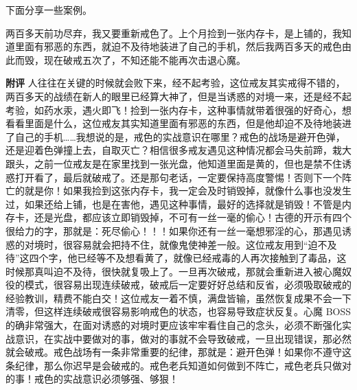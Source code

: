 下面分享一些案例。

\begin{case}
    两百多天前功尽弃，我又要重新戒色了。上个月捡到一张内存卡，是上铺的，我知道里面有邪恶的东西，就迫不及待地装进了自己的手机，然后我两百多天的戒色由此而毁，现在破戒五次了，不知还能不能再次击退心魔。

    \textbf{附评} 人往往在关键的时候就会败下来，经不起考验，这位戒友其实戒得不错的，两百多天的战绩在新人的眼里已经算大神了，但是当诱惑的对境一来，还是经不起考验，如药水汞，遇火即飞！捡到一张内存卡，这种事情就带着很强的好奇心，想看看里面是什么，这位戒友其实知道里面有邪恶的东西，但是他却迫不及待地装进了自己的手机……我想说的是，戒色的实战意识在哪里？戒色的战场是避开色弹，还是迎着色弹撞上去，自取灭亡？相信很多戒友遇见这种情况都会马失前蹄，栽大跟头，之前一位戒友是在家里找到一张光盘，他知道里面是黄的，但也是禁不住诱惑打开看了，最后就破戒了。还是那句老话，一定要保持高度警惕！否则下一个阵亡的就是你！如果我捡到这张内存卡，我一定会及时销毁掉，就像什么事也没发生过，如果还给上铺，也是在害他，遇见这种事情，最好的选择就是销毁！不管是内存卡，还是光盘，都应该立即销毁掉，不可有一丝一毫的偷心！古德的开示有四个很给力的字，那就是：死尽偷心！！！如果你还有一丝一毫想邪淫的心，那遇见诱惑的对境时，很容易就会把持不住，就像鬼使神差一般。这位戒友用到“迫不及待”这四个字，他已经等不及想看黄了，就像已经戒毒的人再次接触到了毒品，这时候那真叫迫不及待，很快就复吸上了。一旦再次破戒，那就会重新进入被心魔奴役的模式，很容易出现连续破戒，破戒后一定要好好总结和反省，必须吸取破戒的经验教训，精费不能白交！这位戒友一着不慎，满盘皆输，虽然恢复成果不会一下清零，但这样连续破戒很容易影响戒色的状态，也容易导致症状反复。心魔 BOSS 的确非常强大，在面对诱惑的对境时更应该牢牢看住自己的念头，必须不断强化实战意识，在实战中要做对的事，做对的事就不会导致破戒，一旦出现错误，那必然就会破戒。戒色战场有一条非常重要的纪律，那就是：避开色弹！如果你不遵守这条纪律，那么你迟早是会破戒的。戒色老兵知道如何做到不阵亡，戒色老兵只做对的事！戒色的实战意识必须够强、够狠！
\end{case}

